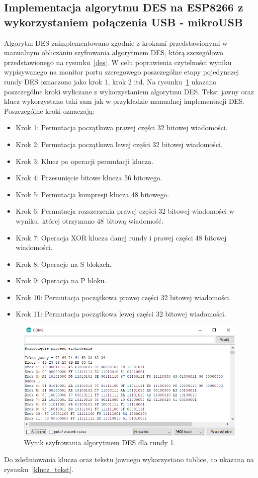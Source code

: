 \documentclass[12p]{article}
\begin{document}
\subsection{Implementacja algorytmu DES na ESP8266 z wykorzystaniem \mbox{połączenia} USB - mikroUSB}

\quad Algorytm DES zaimplementowano zgodnie z krokami przedstawionymi w manualnym obliczaniu szyfrowania algorytmem DES, którą szczegółowo przedstawionego na rysunku~\ref{des}. W celu poprawienia czytelności wyniku wypisywanego na monitor portu szeregowego poszczególne etapy pojedynczej rundy DES oznaczono jako krok 1, krok 2 itd. Na rysunku~\ref{runda_1} ukazano poszczególne kroki wyliczane z wykorzystaniem algorytmu DES. Tekst jawny oraz klucz wykorzystano taki sam jak w przykładzie manualnej implementacji DES. Poszczególne kroki oznaczają:
\begin{itemize}
\item Krok 1: Permutacja początkowa prawej części 32 bitowej wiadomości.
\item Krok 2: Permutacja początkowa lewej części 32 bitowej wiadomości.
\item Krok 3: Klucz po operacji permutacji klucza.
\item Krok 4: Przesunięcie bitowe klucza 56 bitowego.
\item Krok 5: Permutacja kompresji klucza 48 bitowego.
\item Krok 6: Permutacja rozszerzenia prawej części 32 bitowej wiadomości w wyniku, której otrzymano 48 bitową wiadomość.
\item Krok 7: Operacja XOR klucza danej rundy i prawej części 48 bitowej wiadomości.
\item Krok 8: Operacje na S blokach.
\item Krok 9: Operacja na P bloku.
\item Krok 10: Permutacja początkowa prawej części 32 bitowej wiadomości.
\item Krok 11: Permutacja początkowa lewej części 32 bitowej wiadomości.
\end{itemize}

\begin{figure}[H]
\centering
\includegraphics[width=12cm]{runda_1.jpg}
\caption{Wynik szyfrowania algorytmem DES dla rundy 1.}\label{runda_1}
\end{figure}
\newpage
Do zdefiniowania klucza oraz tekstu jawnego wykorzystano tablice, co ukazana na rysunku~\ref{klucz_tekst}.
\end{document}
